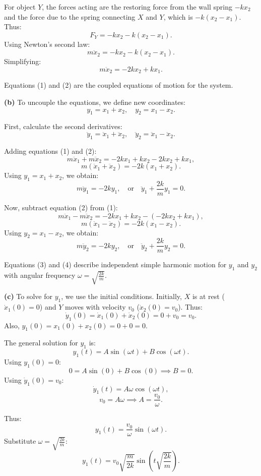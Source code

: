 \documentclass{article}
\begin{document}
For object $Y$, the forces acting are the restoring force from the wall spring $-kx_2$ and the force due to the spring connecting $X$ and $Y$, which is $-k(x_2 - x_1)$. Thus:
\[
F_Y = -kx_2 - k(x_2 - x_1).
\]
Using Newton's second law:
\[
m\ddot{x}_2 = -kx_2 - k(x_2 - x_1).
\]
Simplifying:
\[
m\ddot{x}_2 = -2kx_2 + kx_1. \tag{2}
\]

Equations (1) and (2) are the coupled equations of motion for the system.

\vspace{0.5cm}

\textbf{(b)} To uncouple the equations, we define new coordinates:
\[
y_1 = x_1 + x_2, \quad y_2 = x_1 - x_2.
\]

First, calculate the second derivatives:
\[
\ddot{y}_1 = \ddot{x}_1 + \ddot{x}_2, \quad \ddot{y}_2 = \ddot{x}_1 - \ddot{x}_2.
\]

Adding equations (1) and (2):
\[
m\ddot{x}_1 + m\ddot{x}_2 = -2kx_1 + kx_2 - 2kx_2 + kx_1,
\]
\[
m(\ddot{x}_1 + \ddot{x}_2) = -2k(x_1 + x_2).
\]
Using $y_1 = x_1 + x_2$, we obtain:
\[
m\ddot{y}_1 = -2ky_1, \quad \text{or} \quad \ddot{y}_1 + \frac{2k}{m}y_1 = 0. \tag{3}
\]

Now, subtract equation (2) from (1):
\[
m\ddot{x}_1 - m\ddot{x}_2 = -2kx_1 + kx_2 - (-2kx_2 + kx_1),
\]
\[
m(\ddot{x}_1 - \ddot{x}_2) = -2k(x_1 - x_2).
\]
Using $y_2 = x_1 - x_2$, we obtain:
\[
m\ddot{y}_2 = -2ky_2, \quad \text{or} \quad \ddot{y}_2 + \frac{2k}{m}y_2 = 0. \tag{4}
\]

Equations (3) and (4) describe independent simple harmonic motion for $y_1$ and $y_2$ with angular frequency $\omega = \sqrt{\frac{2k}{m}}$.

\vspace{0.5cm}

\textbf{(c)} To solve for $y_1$, we use the initial conditions. Initially, $X$ is at rest ($\dot{x}_1(0) = 0$) and $Y$ moves with velocity $v_0$ ($\dot{x}_2(0) = v_0$). Thus:
\[
\dot{y}_1(0) = \dot{x}_1(0) + \dot{x}_2(0) = 0 + v_0 = v_0.
\]
Also, $y_1(0) = x_1(0) + x_2(0) = 0 + 0 = 0$.

The general solution for $y_1$ is:
\[
y_1(t) = A\sin\left(\omega t\right) + B\cos\left(\omega t\right).
\]
Using $y_1(0) = 0$:
\[
0 = A\sin(0) + B\cos(0) \implies B = 0.
\]
Using $\dot{y}_1(0) = v_0$:
\[
\dot{y}_1(t) = A\omega\cos(\omega t),
\]
\[
v_0 = A\omega \implies A = \frac{v_0}{\omega}.
\]

Thus:
\[
y_1(t) = \frac{v_0}{\omega}\sin(\omega t).
\]
Substitute $\omega = \sqrt{\frac{2k}{m}}$:
\[
y_1(t) = v_0\sqrt{\frac{m}{2k}}\sin\left(t\sqrt{\frac{2k}{m}}\right).
\]
\end{document}
